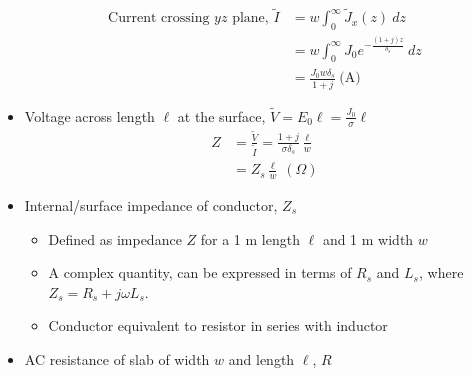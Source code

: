 \documentclass[a4paper]{article}
\begin{document}
\begin{itemize}
\begin{minipage}{0.3\textwidth}
    \begin{align*}
        \text{Current crossing }yz\text{ plane, }\widetilde{I} &= w\int_0^\infty\widetilde{J}_x(z)\ dz\\
        &=w\int_0^\infty J_0e^{-\frac{(1+j)z}{\delta_s}}\ dz\\
        &= \frac{J_0w\delta_s}{1+j}\ \text{(A)}
    \end{align*}
    \end{minipage}
    \item Voltage across length $\ell$ at the surface, $\widetilde{V} = E_0\ell = \displaystyle\frac{J_0}{\sigma}\ell$
    \begin{align*}
        Z &= \frac{\widetilde{V}}{\widetilde{I}} = \frac{1+j}{\sigma\delta_s}\frac{\ell}{w}\\
        &= Z_s\frac{\ell}{w}\ (\Omega)
    \end{align*}
    \newpage
    \item Internal/surface impedance of conductor, $Z_s$
    \begin{center}
    \end{center}
    \begin{itemize}[label=$\circ$]
        \item Defined as impedance $Z$ for a 1 m length $\ell$ and 1 m width $w$
        \item A complex quantity, can be expressed in terms of $R_s$ and $L_s$, where $Z_s = R_s+j\omega L_s$.
        \begin{center}
        \end{center}
        \item Conductor equivalent to resistor in series with inductor
    \end{itemize}
    \item AC resistance of slab of width $w$ and length $\ell$, $R$
    \begin{center}
    \end{center}
\end{itemize}
\end{document}
